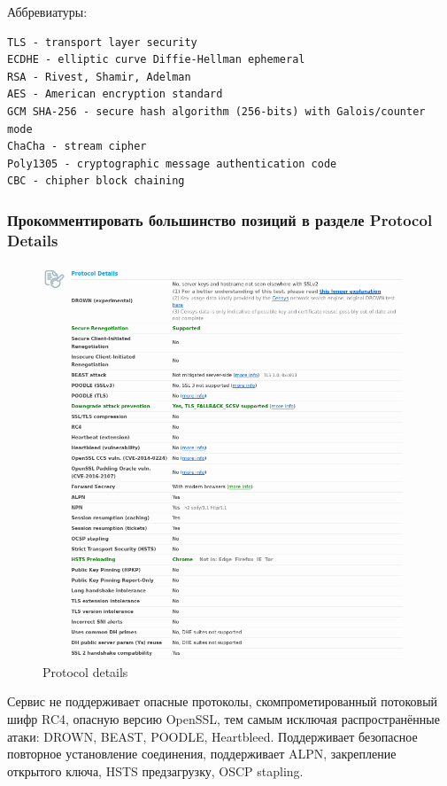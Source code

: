 \documentclass[a4paper]{article}
\begin{document}
Аббревиатуры:

\begin{verbatim}
TLS - transport layer security
ECDHE - elliptic curve Diffie-Hellman ephemeral
RSA - Rivest, Shamir, Adelman
AES - American encryption standard
GCM SHA-256 - secure hash algorithm (256-bits) with Galois/counter mode
ChaCha - stream cipher
Poly1305 - cryptographic message authentication code
CBC - chipher block chaining
\end{verbatim}



\subsubsection{Прокомментировать большинство позиций в разделе Protocol Details}

\begin{figure}[H]
	\begin{center}
		\includegraphics[scale=0.6]{pics/google_protocol_details.png}
		\caption{Protocol details} 
		\label{pic:pic_name}
	\end{center}
\end{figure}

Сервис не поддерживает опасные протоколы, скомпрометированный потоковый шифр RC4, опасную версию OpenSSL, тем самым исключая распространённые атаки: DROWN, BEAST, POODLE, Heartbleed. Поддерживает безопасное повторное установление соединения, поддерживает ALPN, закрепление открытого ключа, HSTS предзагрузку, OSCP stapling. 
\end{document}
